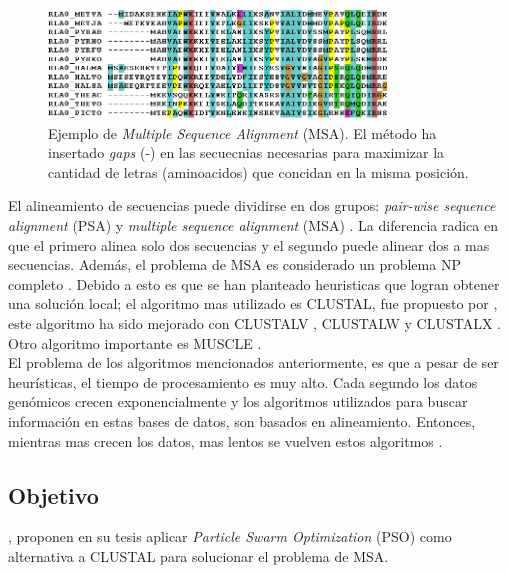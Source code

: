 \documentclass{cup-pan}
\begin{document}
	\begin{figure}[h]
		\centering
		\includegraphics[width=0.8\textwidth]{images/msa}
		\caption{Ejemplo de \textit{Multiple Sequence Alignment} (MSA). El método ha insertado \textit{gaps} (-) en las secuecnias necesarias para maximizar la cantidad de letras (aminoacidos) que concidan en la misma posición.}
		\label{fig:msa}
	\end{figure}

	El alineamiento de secuencias puede dividirse en dos grupos: \textit{pair-wise sequence alignment} (PSA) y \textit{multiple sequence alignment} (MSA) \citep{xiong2006essential}. La diferencia radica en que el primero alinea solo dos secuencias y el segundo puede alinear dos a mas secuencias. Además, el problema de MSA es considerado un problema NP completo \citep{wang1994complexity}. Debido a esto es que se han planteado heuristicas que logran obtener una solución local; el algoritmo mas utilizado es CLUSTAL, fue propuesto por \citet{higgins1988clustal}, este algoritmo ha sido mejorado con CLUSTALV \citep{higgins1992clustal}, CLUSTALW \citep{thompson1994clustal} y CLUSTALX \citep{jeanmougin1998multiple}. Otro algoritmo importante es MUSCLE \citep{edgar2004muscle}. \\
	
	
	El problema de los algoritmos mencionados anteriormente, es que a pesar de ser heurísticas, el tiempo de procesamiento es muy alto. Cada segundo los datos genómicos crecen exponencialmente \citep{archibald2018genomics} y los algoritmos utilizados para buscar información en estas bases de datos, son basados en alineamiento. Entonces, mientras mas crecen los datos, mas lentos se vuelven estos algoritmos \citep{zablocki2009multiple}. 
	
	\subsection{Objetivo}
	
	\citet{zablocki2009multiple}, proponen en su tesis aplicar \textit{Particle Swarm Optimization} (PSO) como alternativa a CLUSTAL para solucionar el problema de MSA.\\
\end{document}
